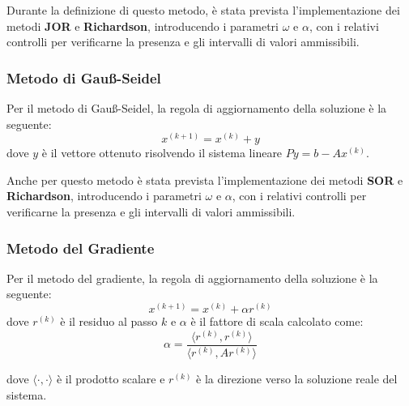 Durante la definizione di questo metodo, è stata prevista l'implementazione dei
metodi \textbf{JOR} e \textbf{Richardson}, introducendo i parametri $\omega$ e
$\alpha$, con i relativi controlli per verificarne la presenza e gli intervalli
di valori ammissibili.
\subsubsection{Metodo di Gauß-Seidel}
Per il metodo di Gauß-Seidel, la regola di aggiornamento della soluzione è la seguente:
\begin{equation}
    x^{(k+1)} = x^{(k)} + y
\end{equation}
dove $y$ è il vettore ottenuto risolvendo il sistema lineare $Py = b - Ax^{(k)}$.

Anche per questo metodo è stata prevista l'implementazione dei metodi \textbf{SOR}
e \textbf{Richardson}, introducendo i parametri $\omega$ e $\alpha$, con i relativi
controlli per verificarne la presenza e gli intervalli di valori ammissibili.

\subsubsection{Metodo del Gradiente}
Per il metodo del gradiente, la regola di aggiornamento della soluzione è la seguente:
\begin{equation}
    x^{(k+1)} = x^{(k)} + \alpha r^{(k)}
\end{equation}
dove $r^{(k)}$ è il residuo al passo $k$ e $\alpha$ è il fattore di scala calcolato
come:
\begin{equation}
    \alpha = \frac{\langle r^{(k)}, r^{(k)}\rangle}{\langle r^{(k)}, Ar^{(k)}\rangle}
\end{equation}

dove $\langle \cdot, \cdot \rangle$ è il prodotto scalare e $r^{(k)}$ è la direzione
verso la soluzione reale del sistema.

